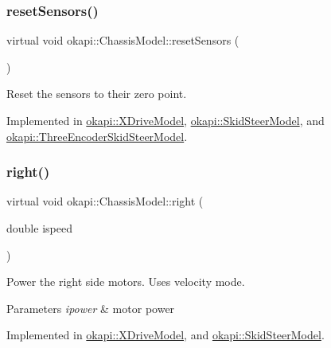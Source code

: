 \mbox{\label{classokapi_1_1ChassisModel_a6bd7e6bb60d41d3f1f5a5a129acfe1b6}} 
\subsubsection{\texorpdfstring{resetSensors()}{resetSensors()}}
{\footnotesize\ttfamily virtual void okapi\+::\+Chassis\+Model\+::reset\+Sensors (\begin{DoxyParamCaption}{ }\end{DoxyParamCaption})\hspace{0.3cm}{\ttfamily [pure virtual]}}

Reset the sensors to their zero point. 

Implemented in \mbox{\hyperlink{classokapi_1_1XDriveModel_adbc23b11cde6aebb3c7eefb1f0251af7}{okapi\+::\+X\+Drive\+Model}}, \mbox{\hyperlink{classokapi_1_1SkidSteerModel_af8885fc16e654eafa872dd7c760591cf}{okapi\+::\+Skid\+Steer\+Model}}, and \mbox{\hyperlink{classokapi_1_1ThreeEncoderSkidSteerModel_a6e4d43a1f3027798c0451c93f8cde057}{okapi\+::\+Three\+Encoder\+Skid\+Steer\+Model}}.

\mbox{\label{classokapi_1_1ChassisModel_a282fcf947aea9630cadd2c673eb5f7e3}} 
\subsubsection{\texorpdfstring{right()}{right()}}
{\footnotesize\ttfamily virtual void okapi\+::\+Chassis\+Model\+::right (\begin{DoxyParamCaption}\item[{double}]{ispeed }\end{DoxyParamCaption})\hspace{0.3cm}{\ttfamily [pure virtual]}}

Power the right side motors. Uses velocity mode.


\begin{DoxyParams}{Parameters}
{\em ipower} & motor power \\
\hline
\end{DoxyParams}


Implemented in \mbox{\hyperlink{classokapi_1_1XDriveModel_a21bc8f93cda3b0b58ec6543a6dc02c24}{okapi\+::\+X\+Drive\+Model}}, and \mbox{\hyperlink{classokapi_1_1SkidSteerModel_ada9bd222b5aeaa0507b57906ac59dd3b}{okapi\+::\+Skid\+Steer\+Model}}.


